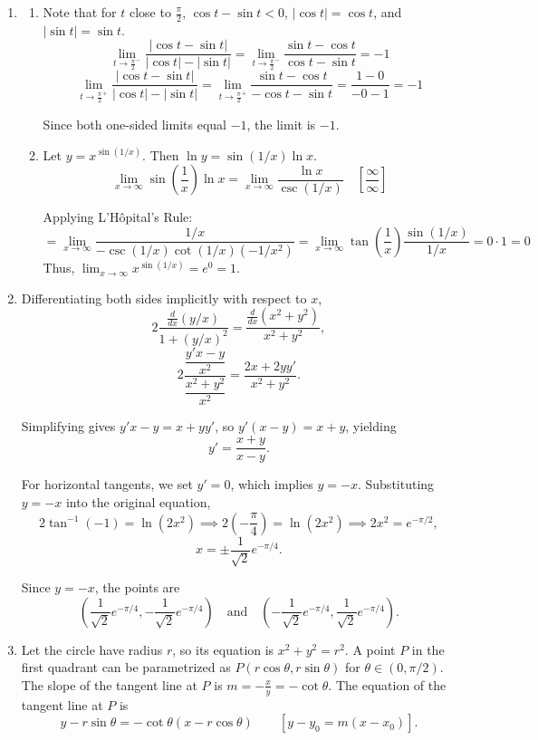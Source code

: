 \documentclass[a4paper, 12pt]{article}
\begin{document}
\begin{enumerate}[leftmargin=*,label=\textbf{\arabic*.}]
\item 
\begin{enumerate}[leftmargin=*,label=\textbf{\alph*.}]
\item Note that for $t$ close to $\frac{\pi}{2}$, $\cos t - \sin t < 0$, $\left|\cos t\right| = \cos t$, and $\left|\sin t\right| = \sin t$.
\[\lim_{t \to \frac{\pi}{2}^-} \frac{\left|\cos t - \sin t\right|}{\left|\cos t\right| - \left|\sin t\right|} = \lim_{t \to \frac{\pi}{2}^-} \frac{\sin t - \cos t}{\cos t - \sin t} = -1\]
\[\lim_{t \to \frac{\pi}{2}^+} \frac{\left|\cos t - \sin t\right|}{\left|\cos t\right| - \left|\sin t\right|} = \lim_{t \to \frac{\pi}{2}^+} \frac{\sin t - \cos t}{-\cos t - \sin t} = \frac{1 - 0}{-0 - 1} = -1\]

Since both one-sided limits equal $-1$, the limit is $\boxed{-1}$.

\item Let $y = x^{\sin(1/x)}$. Then $\ln y = \sin(1/x) \ln x$.
\[\lim_{x \to \infty} \sin\left(\frac{1}{x}\right) \ln x = \lim_{x \to \infty} \frac{\ln x}{\csc(1/x)} \quad \left[\frac{\infty}{\infty}\right]\]

Applying L'Hôpital's Rule:
\[= \lim_{x \to \infty} \frac{1/x}{-\csc(1/x) \cot(1/x) (-1/x^2)} = \lim_{x \to \infty} \tan\left(\frac{1}{x}\right) \frac{\sin(1/x)}{1/x} = 0 \cdot 1 = 0\]
Thus, $\displaystyle\lim_{x \to \infty} x^{\sin(1/x)} = e^0 = \boxed1$.
\end{enumerate}

\item Differentiating both sides implicitly with respect to $x$,
\[2 \frac{\frac{d}{dx}(y/x)}{1 + (y/x)^2} = \frac{\frac{d}{dx}(x^2 + y^2)}{x^2 + y^2},\]
\[2 \frac{\dfrac{y'x - y}{x^2}}{\dfrac{x^2 + y^2}{x^2}} = \frac{2x + 2yy'}{x^2 + y^2}.\]

Simplifying gives $y'x - y = x + yy'$, so $y'(x - y) = x + y$, yielding
\[y' = \frac{x + y}{x - y}.\]

For horizontal tangents, we set $y' = 0$, which implies $y = -x$. Substituting $y = -x$ into the original equation,
\[2 \tan^{-1}(-1) = \ln(2x^2) \implies 2 \left(-\frac{\pi}{4}\right) = \ln(2x^2) \implies 2x^2 = e^{-\pi/2},\]
\[x = \pm \frac{1}{\sqrt{2}} e^{-\pi/4}.\]

Since $y = -x$, the points are
\[\boxed{\left(\frac{1}{\sqrt{2}} e^{-\pi/4}, -\frac{1}{\sqrt{2}} e^{-\pi/4}\right) \quad \text{and} \quad \left(-\frac{1}{\sqrt{2}} e^{-\pi/4}, \frac{1}{\sqrt{2}} e^{-\pi/4}\right)}.\]

\item Let the circle have radius $r$, so its equation is $x^2 + y^2 = r^2$. A point $P$ in the first quadrant can be parametrized as $P(r \cos \theta, r \sin \theta)$ for $\theta \in (0, \pi/2)$. The slope of the tangent line at $P$ is $m =-\frac xy= -\cot \theta$. The equation of the tangent line at $P$ is
\[y - r \sin \theta = -\cot \theta (x - r \cos \theta) \qquad[y-y_0=m(x-x_0)].\]


\end{enumerate}
\end{document}
